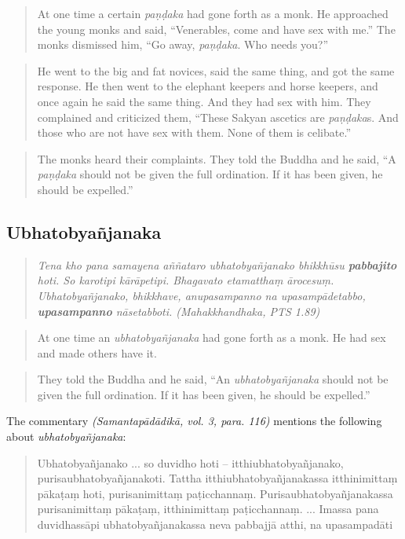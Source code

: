 \medskip

\begin{quote}
At one time a certain {\em paṇḍaka} had gone forth as a monk. He approached the young monks and said, “Venerables, come and have sex with me.”
The monks dismissed him, “Go away, {\em paṇḍaka}. Who needs you?”
\end{quote}
\begin{quote}
He went to the big and fat novices, said the same thing, and got the same response.
He then went to the elephant keepers and horse keepers, and once again he said the same thing. And they had sex with him. They complained and criticized them, “These Sakyan ascetics are {\em paṇḍaka}s. And those who are not have sex with them. None of them is celibate.”
\end{quote}
\begin{quote}
The monks heard their complaints. They told the Buddha and he said, “A {\em paṇḍaka} should not be given the full ordination. If it has been given, he should be expelled.”
\end{quote}



\subsection{Ubhatob­yañ­janaka}

\begin{quote}
{\em Tena kho pana samayena aññataro ubhatobyañjanako bhikkhūsu \textbf{pabbajito} hoti. So karotipi kārāpetipi. Bhagavato etamatthaṃ ārocesuṃ. Ubhatobyañjanako, bhikkhave, anupasampanno na upasampādetabbo, \textbf{upasampanno} nāsetabboti. (Mahakkhandhaka, PTS 1.89)}
\end{quote}

\medskip

\begin{quote}
At one time an {\em ubhatob­yañ­janaka} had gone forth as a monk. He had sex and made others have it.
\end{quote}
\begin{quote}
They told the Buddha and he said, “An {\em ubhatob­yañ­janaka} should not be given the full ordination. If it has been given, he should be expelled.”
\end{quote}

The commentary {\em (Samantapādādikā, vol. 3, para. 116)} mentions the following about {\em ubhatob­yañ­janaka}:

\begin{quote}
Ubhatobyañjanako ... so duvidho hoti – itthiubhatobyañjanako, purisaubhatobyañjanakoti. Tattha itthiubhatobyañjanakassa itthinimittaṃ pākaṭaṃ hoti, purisanimittaṃ paṭicchannaṃ. Purisaubhatobyañjanakassa purisanimittaṃ pākaṭaṃ, itthinimittaṃ paṭicchannaṃ. ... Imassa pana duvidhassāpi ubhatobyañjanakassa neva pabbajjā atthi, na upasampadāti
\end{quote}

